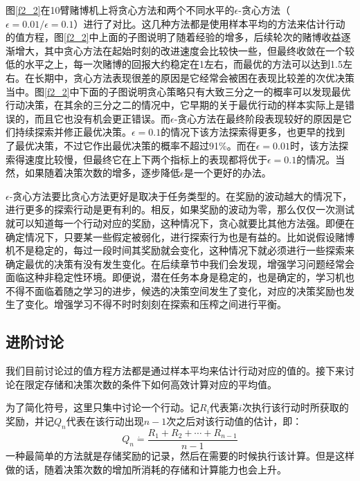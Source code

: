 \documentclass{ctexart}
\begin{document}
            图\ref{f2_2}在10臂赌博机上将贪心方法和两个不同水平的$\epsilon$-贪心方法（$\epsilon=0.01/\epsilon=0.1$）进行了对比。这几种方法都是使用样本平均的方法来估计行动的值方程，图\ref{f2_2}中上面的子图说明了随着经验的增多，后续轮次的赌博收益逐渐增大，其中贪心方法在起始时刻的改进速度会比较快一些，但最终收敛在一个较低的水平之上，每一次赌博的回报大约稳定在1左右，而最优的方法可以达到1.5左右。在长期中，贪心方法表现很差的原因是它经常会被困在表现比较差的次优决策当中。图\ref{f2_2}中下面的子图说明贪心策略只有大致三分之一的概率可以发现最优行动决策，在其余的三分之二的情况中，它早期的关于最优行动的样本实际上是错误的，而且它也没有机会更正错误。而$\epsilon$-贪心方法在最终阶段表现较好的原因是它们持续探索并修正最优决策。$\epsilon=0.1$的情况下该方法探索得更多，也更早的找到了最优决策，不过它作出最优决策的概率不超过91\%。而在$\epsilon=0.01$时，该方法探索得速度比较慢，但最终它在上下两个指标上的表现都将优于$\epsilon=0.1$的情况。当然，如果随着决策次数的增多，逐步降低$\epsilon$是一个更好的办法。

            $\epsilon$-贪心方法要比贪心方法更好是取决于任务类型的。在奖励的波动越大的情况下，进行更多的探索行动是更有利的。相反，如果奖励的波动为零，那么仅仅一次测试就可以知道每一个行动对应的奖励，这种情况下，贪心就要比其他方法强。即便在确定情况下，只要某一些假定被弱化，进行探索行为也是有益的。比如说假设赌博机不是稳定的，每过一段时间其奖励就会变化，这种情况下就必须进行一些探索来确定最优的决策有没有发生变化。在后续章节中我们会发现，增强学习问题经常会面临这种非稳定性环境。即便说，潜在任务本身是稳定的，也是确定的，学习机也不得不面临着随之学习的进步，候选的决策空间发生了变化，对应的决策奖励也发生了变化。增强学习不得不时时刻刻在探索和压榨之间进行平衡。

        \subsection{进阶讨论}
            我们目前讨论过的值方程方法都是通过样本平均来估计行动对应的值的。接下来讨论在限定存储和决策次数的条件下如何高效计算对应的平均值。

            为了简化符号，这里只集中讨论一个行动。记$R_i$代表第$i$次执行该行动时所获取的奖励，并记$Q_n$代表在该行动出现$n-1$次之后对该行动值的估计，即：
            \begin{equation}
                Q_n \dot{=} \frac{R_1 + R_2 + \cdots + R_{n-1}}{n-1}
                \label{e_5}
            \end{equation}
            一种最简单的方法就是存储奖励的记录，然后在需要的时候执行该计算。但是这样做的话，随着决策次数的增加所消耗的存储和计算能力也会上升。
\end{document}
